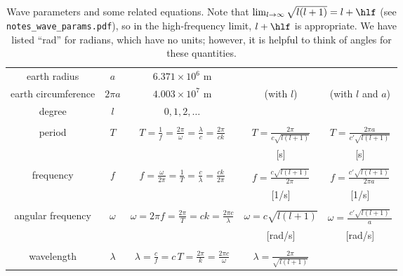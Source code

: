 \begin{table}[h]
\caption[Wave parameters and some related equations]
{{
Wave parameters and some related equations.
Note that $\lim_{l\rightarrow \infty } \sqrt{l(l+1)} = l + \hlf$ (see {\tt notes\_wave\_params.pdf}), so in the high-frequency limit, $l + \hlf$ is appropriate.
We have listed ``rad'' for radians, which have no units; however, it is helpful to think of angles for these quantities.
\label{tab:waveparm}
}}
\hspace{-1cm}
\begin{tabular}{||c|c|c|c|c||}
\hline
%
earth radius & \hspace{10pt} $a$ \hspace{10pt}
& $6.371 \times 10^6$ m & & \\
\cline{1-3}
earth circumference & $2\pi a$ & $4.003 \times 10^7$ m & (with $l$) & (with $l$ and $a$)  \\
\cline{1-3}
%
degree	& $l$ & $0,1,2,\ldots$ & & \\
\hline
%
& & & & \\
period		& $T$
& $T = \frac{1}{f} = \frac{2\pi}{\omega} = \frac{\lambda}{c} = \frac{2\pi}{c k}$ 
& $T = \frac{2\pi}{c\sqrt{l(l+1)}}$ 
& $T = \frac{2\pi a}{c'\sqrt{l(l+1)}}$
\\
& & & [s] & [s] \\ \hline
%
& & & & \\
frequency	& $f$
& $f = \frac{\omega}{2\pi} = \frac{1}{T} = \frac{c}{\lambda} = \frac{ck}{2\pi}$ 
& $f = \frac{c\sqrt{l(l+1)}}{2\pi}$
& $f = \frac{c'\sqrt{l(l+1)}}{2\pi a}$
\\
& & & [1/s] & [1/s] \\ \hline
%
& & & & \\
angular frequency	& $\omega$		
& $\omega = 2\pi f = \frac{2\pi}{T} = ck = \frac{2\pi c}{\lambda}$
& $\omega = c\sqrt{l(l+1)}$
& $\omega = \frac{\;c'\sqrt{l(l+1)}\;}{a}$
\\
& & & [rad/s] & [rad/s] \\ \hline\hline
%
& & & & \\
wavelength	& $\lambda$		
& $\lambda = \frac{c}{f} = c\,T = \frac{2\pi}{k} = \frac{2\pi c}{\omega}$
& $\lambda = \frac{2\pi}{\sqrt{l(l+1)}}$

\end{tabular}
\end{table}
